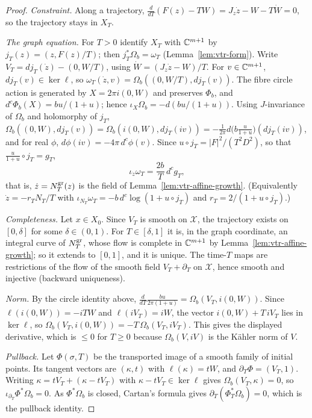 \begin{proof}
\emph{Constraint.} Along a trajectory, $\frac d{dT}(F(z)-TW)=J_z\dot z-W-T\dot W=0$, so the trajectory stays in $X_T$.

\emph{The graph equation.} For $T>0$ identify $X_T$ with $\mathbb{C}^{m+1}$ by $j_T(z)=(z,F(z)/T)$; then $j_T^*\Omega_b=\omega_T$
(Lemma~\ref{lem:vtr-form}). Write $V_T=dj_T(\dot z)-(0,W/T)$, using $\dot W=(J_z\dot z-W)/T$. For $v\in\mathbb{C}^{m+1}$, $dj_T(v)\in\ker\ell$, so
$\omega_T(\dot z,v)=\Omega_b((0,W/T),dj_T(v))$. The fibre circle action is generated by $X=2\pi i(0,W)$ and preserves $\Phi_b$, and
$d^c\Phi_b(X)=bu/(1+u)$; hence $\iota_X\Omega_b=-d(bu/(1+u))$. Using $J$-invariance of $\Omega_b$ and holomorphy of $j_T$,
$\Omega_b((0,W),dj_T(v))=\Omega_b(i(0,W),dj_T(iv))=-\frac1{2\pi}d\bigl(b\tfrac u{1+u}\bigr)(dj_T(iv))$, and for real $\phi$,
$d\phi(iv)=-4\pi\,d^c\phi(v)$. Since $u\circ j_T=|F|^2/(T^2D^2)$, so that $\frac u{1+u}\circ j_T=g_T$,
\[
 \iota_{\dot z}\omega_T=\frac{2b}T\,d^cg_T ,
\]
that is, $\dot z=N^{\rm gr}_T(z)$ is the field of Lemma~\ref{lem:vtr-affine-growth}. (Equivalently $\dot z=-r_TN_T/T$ with
$\iota_{N_T}\omega_T=-b\,d^c\log(1+u\circ j_T)$ and $r_T=2/(1+u\circ j_T)$.)

\emph{Completeness.} Let $x\in X_0$. Since $V_T$ is smooth on $\mathcal X$, the trajectory exists on $[0,\delta]$ for some
$\delta\in(0,1)$. For $T\in[\delta,1]$ it is, in the graph coordinate, an integral curve of $N^{\rm gr}_T$, whose flow is complete in
$\mathbb{C}^{m+1}$ by Lemma~\ref{lem:vtr-affine-growth}; so it extends to $[0,1]$, and it is unique. The time-$T$ maps are restrictions of
the flow of the smooth field $V_T+\partial_T$ on $\mathcal X$, hence smooth and injective (backward uniqueness).

\emph{Norm.} By the circle identity above, $\frac d{dT}\frac{bu}{2\pi(1+u)}=\Omega_b(V_T,i(0,W))$. Since $\ell(i(0,W))=-iTW$ and
$\ell(iV_T)=iW$, the vector $i(0,W)+T\,iV_T$ lies in $\ker\ell$, so $\Omega_b(V_T,i(0,W))=-T\,\Omega_b(V_T,iV_T)$. This gives the
displayed derivative, which is $\le0$ for $T\ge0$ because $\Omega_b(V,iV)$ is the Kähler norm of $V$.

\emph{Pullback.} Let $\Phi(\sigma,T)$ be the transported image of a smooth family of initial points. Its tangent vectors are
$(\kappa,t)$ with $\ell(\kappa)=tW$, and $\partial_T\Phi=(V_T,1)$. Writing $\kappa=tV_T+(\kappa-tV_T)$ with $\kappa-tV_T\in\ker\ell$
gives $\Omega_b(V_T,\kappa)=0$, so $\iota_{\partial_T}\Phi^*\Omega_b=0$. As $\Phi^*\Omega_b$ is closed, Cartan's formula gives
$\partial_T(\Phi_T^*\Omega_b)=0$, which is the pullback identity.
\end{proof}

